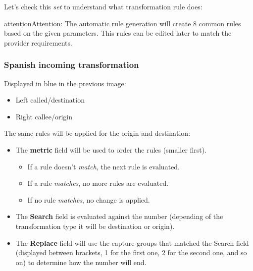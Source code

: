 \documentclass[letterpaper,10pt,english]{sphinxmanual}
\begin{document}
Let's check this \emph{set} to understand what transformation rule does:

\begin{notice}{attention}{Attention:}
The automatic rule generation will create 8 common rules based on
the given parameters. This rules can be edited later to match the provider
requirements.
\end{notice}


\subsubsection{Spanish incoming transformation}
\label{administration_portal/brand/settings/numeric_transformations:spanish-incoming-transformation}
Displayed in blue in the previous image:
\begin{itemize}
\item {} 
Left called/destination

\item {} 
Right callee/origin

\end{itemize}

The same rules will be applied for the origin and destination:
\begin{itemize}
\item {} 
The \textbf{metric} field will be used to order the rules (smaller first).
\begin{itemize}
\item {} 
If a rule doesn't \emph{match}, the next rule is evaluated.

\item {} 
If a rule \emph{matches}, no more rules are evaluated.

\item {} 
If no rule \emph{matches}, no change is applied.

\end{itemize}

\item {} 
The \textbf{Search} field is evaluated against the number (depending of the
transformation type it will be destination or origin).

\item {} 
The \textbf{Replace} field will use the capture groups that matched the Search
field (displayed between brackets, 1 for the first one, 2 for the second
one, and so on) to determine how the number will end.

\end{itemize}
\end{document}
